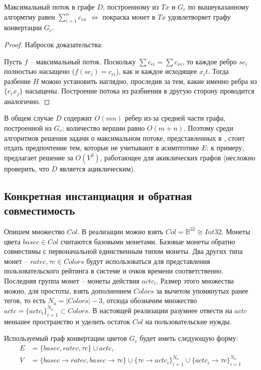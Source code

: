 \documentclass[specification,annotation]{itmo-student-thesis}
\begin{document}
\begin{lemma}
  Максимальный поток в графе $D$, построенному из $Tx$ и $G_c$ по
  вышеуказанному алгормтму равен $\sum_{i=1}^n{c_{en}}$
  $\Leftrightarrow$ покраска монет в $Tx$ удовлетворяет графу
  конвертации $G_c$.
\end{lemma}
\begin{proof}
  Набросок доказательства:

  Пусть $f$ -- максимальный поток. Поскольку $\sum{c_{ei}} =
  \sum{c_{xi}}$, то каждое ребро $se_i$ полностью насыщено ($f(se_i) =
  c_{ei}$), как и каждое исходящее $x_it$. Тогда разбение $H$ можно
  установить наглядно, проследив за тем, какие именно ребра из
  $\{e_ix_j\}$ насыщены. Построение потока из разбиения в другую
  сторону проводится аналогично.
\end{proof}

В общем случае $D$ содержит $O(mn)$ ребер из-за средней части графа,
построенной из $G_c$; количество вершин равно $O(m+n)$. Поэтому среди
алгоритмов решения задачи о максимальном потоке, представленных в
\cite{goldberg1988new}, стоит отдать предпочтение тем, которые не
учитывают в асимптотике $E$: к примеру, \cite{malhotra1978v}
предлагает решение за $O(V^3)$, работающее для акиклических графов
(несложно проверить, что $D$ является ациклическим).

\subsection{Конкретная инстанциация и обратная совместимость}

Опишем множество $Col$. В реализации можно взять $Col =
\mathbb{B}^{32} \cong Int32$. Монеты цвета $basec \in Col$ считаются
базовыми монетами. Базовые монеты обратно совместимы с первоначальной
единственным типом монеты. Два других типа монет -- $ratec, \tau c \in
Colors$ будут использоваться для представления пользовательского
рейтинга в системе и очков времени соответственно. Последняя группа
монет -- монеты действия $actc_i$. Размер этого множества можно, для
простоты, взять дополнением $Colors$ за вычетом упомянутых ранее
тегов, то есть $N_a = |Colors|-3$, отсюда обозначим множество $actc =
\{actc_i\}_{i=1}^{N_a} \subset Colors$. В настоящей реализации
разумнее отвести на $actc$ меньшее пространство и уделить остаток
$Col$ на пользовательские нужды.

Используемый граф конвертации цветов $G_c$ будет иметь следующую
форму:
\begin{align*}
  E &= \{basec, ratec, \tau c\} \cup actc,\\
  V &= \{basec \rightarrow ratec
  , basec \rightarrow \tau c\} \cup
  \{\tau c \rightarrow actc_i\}_{i=1}^{N_a} \cup
  \{actc_i \rightarrow \tau c\}_{i=1}^{N_a}
\end{align*}
\end{document}

